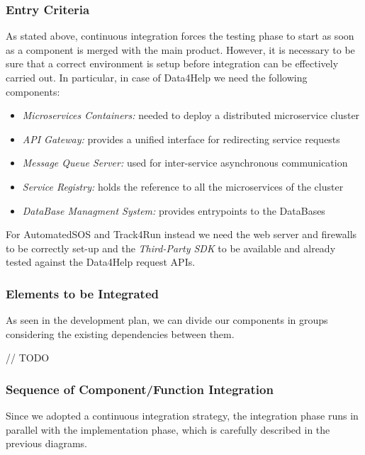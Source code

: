 \subsubsection{Entry Criteria}
As stated above, continuous integration forces the testing phase to start as soon as a component is merged with the main product. However, it is necessary to be sure that a correct environment is setup before integration can be effectively carried out. In particular, in case of Data4Help we need the following components:

\begin{itemize}
    \item \textit{Microservices Containers:} needed to deploy a distributed microservice cluster
    \item \textit{API Gateway:} provides a unified interface for redirecting service requests
    \item \textit{Message Queue Server:} used for inter-service asynchronous communication
    \item \textit{Service Registry:} holds the reference to all the microservices of the cluster
    \item \textit{DataBase Managment System:} provides entrypoints to the DataBases
\end{itemize}

For AutomatedSOS and Track4Run instead we need the web server and firewalls to be correctly set-up and the \textit{Third-Party SDK} to be available and already tested against the Data4Help request APIs.

\subsubsection{Elements to be Integrated}
As seen in the development plan, we can divide our components in groups considering the existing dependencies between them.

// TODO

\subsubsection{Sequence of Component/Function Integration}
Since we adopted a continuous integration strategy, the integration phase runs in parallel  with the implementation phase, which is carefully described in the previous diagrams.
